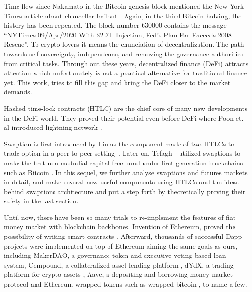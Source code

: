 Time flew since Nakamato in the Bitcoin genesis block \cite{nakamoto2019bitcoin} mentioned the New York Times article about chancellor bailout \cite{times}. Again, in the third Bitcoin halving, the history has been repeated. The block number 630000 contains the message ``NYTimes 09/Apr/2020 With \$2.3T Injection, Fed's Plan Far Exceeds 2008 Rescue''. To crypto lovers it means the enunciation of decentralization. The path towards self-sovereignty, independence, and removing the governance authorities from critical tasks. Through out these years, decentralized finance (DeFi) attracts attention which unfortunately is not a practical alternative for traditional finance yet. 
This work, tries to fill this gap and bring the DeFi closer to the market demands.


Hashed time-lock contracts (HTLC) are the chief core of many new developments in the DeFi world. They proved their potential even before DeFi where Poon et. al introduced lightning network \cite{poon2016bitcoin}. 

Swaption is first introduced by Liu as the component made of two HTLCs to trade option in a peer-to-peer setting~\cite{liu2018atomic}. Later on, Tefagh~\etal~utilized swaptions to make the first non-custodial capital-free bond under first generation blockchains such as Bitcoin \cite{tefagh2020atomic}. In this sequel, we further analyse swaptions and futures markets in detail, and make several new useful components using HTLCs and the ideas behind swaptions architecture and put a step forth by theoretically proving their safety in the last section.


Until now, there have been so many trials to re-implement the features of fiat money market with blockchain backbones. Invention of Ethereum, proved the possibility of writing smart contracts \cite{buterin2014next}. Afterward, thousands of successful Dapp projects were implemented on top of Ethereum aiming the same goals as ours, including MakerDAO, a governance token and executive voting based loan system\cite{maker}, Compound, a collateralized asset-lending platform \cite{compound}, dYdX, a trading platform for crypto assets \cite{dydx}, Aave, a depositing and borrowing money market protocol \cite{aave} and Ethereum wrapped tokens such as wrapped bitcoin \cite{wbtc}, to name a few.


